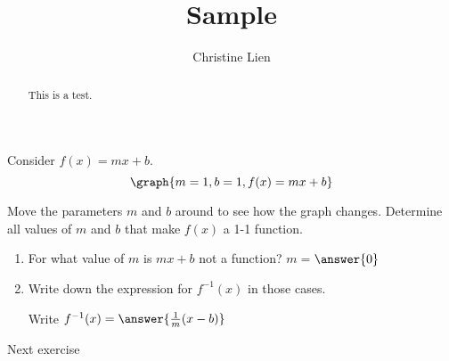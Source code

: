\documentclass{ximera}
\title{Sample}
\author{Christine Lien}
\begin{document}
\begin{abstract}
This is a test. 
\end{abstract}
\maketitle

Consider $f(x)=mx+b$. 
\[\graph{m=1, b=1, f(x)=mx+b}\]

Move the parameters $m$ and $b$ around to see how the graph changes. 
Determine all values of $m$ and $b$ that make $f(x)$ a 1-1 function. 
\begin{exercise}
\noindent
\begin{enumerate}
\item For what value of $m$ is $mx+b$ not a function? $m=$$\answer{0}$



\item Write down the expression for $f^{-1}(x)$ in those cases. 
\begin{prompt}
Write $f^{-1}(x)= \answer{\frac{1}{m}(x-b)}$
\end{prompt}
\end{enumerate}

\end{exercise}

\begin{exercise}
Next exercise
\end{exercise}
\end{document}
